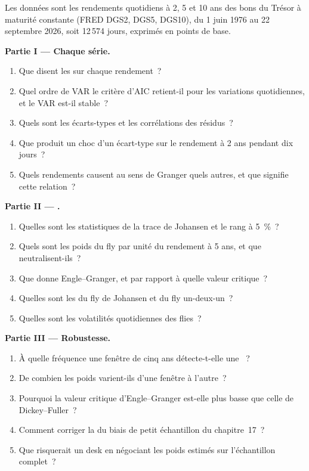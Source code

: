 \begin{problem}\label{pb:qm:multivariate-series-and-cointegration:1}
Les données sont les rendements quotidiens à 2, 5 et 10 ans des bons du Trésor à maturité constante (FRED DGS2, DGS5, DGS10), du 1 juin 1976 au 22 septembre 2026, soit 12\,574 jours, exprimés en points de base.

\medskip\noindent\textbf{Partie I --- Chaque série.}
\begin{enumerate}
\item Que disent les  sur chaque rendement~?
\item Quel ordre de VAR le critère d'AIC retient-il pour les variations quotidiennes, et le VAR est-il stable~?
\item Quels sont les écarts-types et les corrélations des résidus~?
\item Que produit un choc d'un écart-type sur le rendement à 2 ans pendant dix jours~?
\item Quels rendements causent au sens de Granger quels autres, et que signifie cette relation~?
\end{enumerate}

\medskip\noindent\textbf{Partie II --- .}
\begin{enumerate}[resume]
\item Quelles sont les statistiques de la trace de Johansen et le rang à 5~\%~?
\item Quels sont les poids du fly par unité du rendement à 5 ans, et que neutralisent-ils~?
\item Que donne Engle--Granger, et par rapport à quelle valeur critique~?
\item Quelles sont les  du fly de Johansen et du fly un-deux-un~?
\item Quelles sont les volatilités quotidiennes des flies~?
\end{enumerate}

\medskip\noindent\textbf{Partie III --- Robustesse.}
\begin{enumerate}[resume]
\item À quelle fréquence une fenêtre de cinq ans détecte-t-elle une ~?
\item De combien les poids varient-ils d'une fenêtre à l'autre~?
\item Pourquoi la valeur critique d'Engle--Granger est-elle plus basse que celle de Dickey--Fuller~?
\item Comment corriger la  du biais de petit échantillon du chapitre~17~?
\item Que risquerait un desk en négociant les poids estimés sur l'échantillon complet~?
\end{enumerate}


\end{problem}
